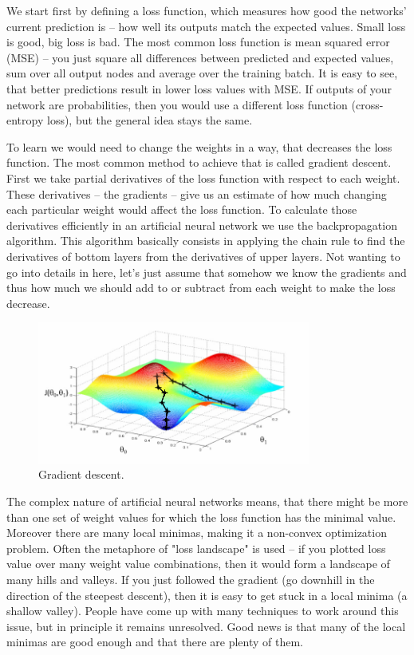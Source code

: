 \documentclass[a4paper,11pt]{article}
\begin{document}
We start first by defining a loss function, which measures how good the networks' current prediction is -- how well its outputs match the expected values. Small loss is good, big loss is bad. The most common loss function is mean squared error (MSE) -- you just square all differences between predicted and expected values, sum over all output nodes and average over the training batch. It is easy to see, that better predictions result in lower loss values with MSE. If outputs of your network are probabilities, then you would use a different loss function (cross-entropy loss), but the general idea stays the same.

To learn we would need to change the weights in a way, that decreases the loss function. The most common method to achieve that is called gradient descent. First we take partial derivatives of the loss function with respect to each weight. These derivatives -- the gradients -- give us an estimate of how much changing each particular weight would affect the loss function. To calculate those derivatives efficiently in an artificial neural network we use the backpropagation algorithm. This algorithm basically consists in applying the chain rule to find the derivatives of bottom layers from the derivatives of upper layers. Not wanting to go into details in here, let's just assume that somehow we know the gradients and thus how much we should add to or subtract from each weight to make the loss decrease.

\begin{figure}[h]
	\centering
	\includegraphics[width=0.8\textwidth]{gradient_descent.png}
	\caption{Gradient descent.}
	\label{gradient_descent}
%
%
\end{figure}

The complex nature of artificial neural networks means, that there might be more than one set of weight values for which the loss function has the minimal value. Moreover there are many local minimas, making it a non-convex optimization problem. Often the metaphore of "loss landscape" is used -- if you plotted loss value over many weight value combinations, then it would form a landscape of many hills and valleys. If you just followed the gradient (go downhill in the direction of the steepest descent), then it is easy to get stuck in a local minima (a shallow valley). People have come up with many techniques to work around this issue, but in principle it remains unresolved. Good news is that many of the local minimas are good enough and that there are plenty of them.
\end{document}
